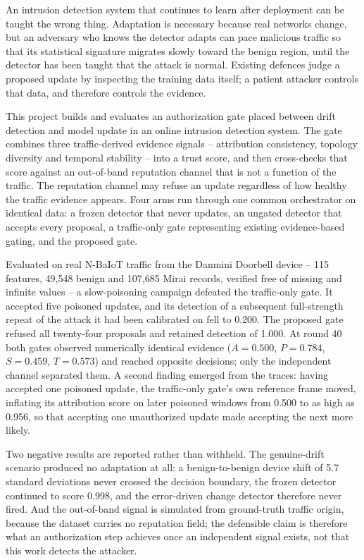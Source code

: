 \documentclass[12pt,a4paper]{report}
\begin{document}
An intrusion detection system that continues to learn after deployment can be
taught the wrong thing. Adaptation is necessary because real networks change,
but an adversary who knows the detector adapts can pace malicious traffic so
that its statistical signature migrates slowly toward the benign region, until
the detector has been taught that the attack is normal. Existing defences judge
a proposed update by inspecting the training data itself; a patient attacker
controls that data, and therefore controls the evidence.

This project builds and evaluates an authorization gate placed between drift
detection and model update in an online intrusion detection system. The gate
combines three traffic-derived evidence signals -- attribution consistency,
topology diversity and temporal stability -- into a trust score, and then
cross-checks that score against an out-of-band reputation channel that is not a
function of the traffic. The reputation channel may refuse an update regardless
of how healthy the traffic evidence appears. Four arms run through one common
orchestrator on identical data: a frozen detector that never updates, an ungated
detector that accepts every proposal, a traffic-only gate representing existing
evidence-based gating, and the proposed gate.

Evaluated on real N-BaIoT traffic from the Danmini Doorbell device -- 115
features, 49{,}548 benign and 107{,}685 Mirai records, verified free of missing
and infinite values -- a slow-poisoning campaign defeated the traffic-only gate.
It accepted five poisoned updates, and its detection of a subsequent
full-strength repeat of the attack it had been calibrated on fell to 0.200. The
proposed gate refused all twenty-four proposals and retained detection of 1.000.
At round 40 both gates observed numerically identical evidence
($A{=}0.500$, $P{=}0.784$, $S{=}0.459$, $T{=}0.573$) and reached opposite
decisions; only the independent channel separated them. A second finding emerged
from the traces: having accepted one poisoned update, the traffic-only gate's own
reference frame moved, inflating its attribution score on later poisoned windows
from 0.500 to as high as 0.956, so that accepting one unauthorized update made
accepting the next more likely.

Two negative results are reported rather than withheld. The genuine-drift
scenario produced no adaptation at all: a benign-to-benign device shift of 5.7
standard deviations never crossed the decision boundary, the frozen detector
continued to score 0.998, and the error-driven change detector therefore never
fired. And the out-of-band signal is simulated from ground-truth traffic origin,
because the dataset carries no reputation field; the defensible claim is
therefore what an authorization step achieves once an independent signal exists,
not that this work detects the attacker.
\end{document}
